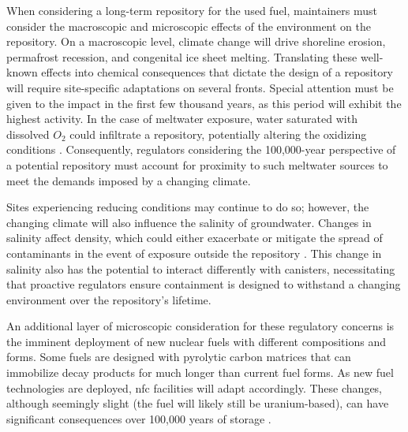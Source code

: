 When considering a long-term repository for the used fuel, maintainers must consider the macroscopic and microscopic effects of the environment on the repository. On a macroscopic level, climate change will drive shoreline erosion, permafrost recession, and congenital ice sheet melting. Translating these well-known effects into chemical consequences that dictate the design of a repository will require site-specific adaptations on several fronts. Special attention must be given to the impact in the first few thousand years, as this period will exhibit the highest activity. In the case of meltwater exposure, water saturated with dissolved $O_2$ could infiltrate a repository, potentially altering the oxidizing conditions \cite{gurban_hydrochemical_2001}. Consequently, regulators considering the 100,000-year perspective of a potential repository must account for proximity to such meltwater sources to meet the demands imposed by a changing climate.

Sites experiencing reducing conditions may continue to do so; however, the changing climate will also influence the salinity of groundwater. Changes in salinity affect density, which could either exacerbate or mitigate the spread of contaminants in the event of exposure outside the repository \cite{gurban_hydrochemical_2001}. This change in salinity also has the potential to interact differently with canisters, necessitating that proactive regulators ensure containment is designed to withstand a changing environment over the repository's lifetime.

An additional layer of microscopic consideration for these regulatory concerns
is the imminent deployment of new nuclear fuels with different compositions and
forms. Some fuels are designed with pyrolytic carbon matrices that can
immobilize decay products for much longer than current fuel forms. As new fuel
technologies are deployed, \gls{nfc} facilities will adapt accordingly. These changes, although seemingly slight (the fuel will likely still be uranium-based), can have significant consequences over 100,000 years
of storage \cite{hyland_post_closure_2013}.